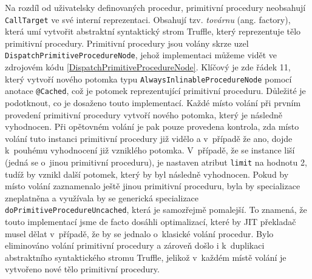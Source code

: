 \documentclass[
  master,
  biblatex,
  figures=true,
  theorems,
  sourcecodes,
  glossaries,
  index
]{kidiplom}
\begin{document}
Na rozdíl od uživatelsky definovaných procedur, primitivní procedury neobsahují \texttt{CallTarget} ve své interní reprezentaci. Obsahují tzv. \textit{továrnu} (ang. factory), která umí vytvořit abstraktní syntaktický strom Truffle, který reprezentuje tělo primitivní procedury. Primitivní procedury jsou volány skrze uzel \texttt{DispatchPrimitiveProcedureNode}, jehož implementaci můžeme vidět ve zdrojovém kódu \ref{DispatchPrimitiveProcedureNode}. Klíčový je zde řádek 11,  který vytvoří nového potomka typu \texttt{AlwaysInlinableProcedureNode} pomocí anotace \texttt{@Cached}, což je potomek reprezentující primitivní proceduru. Důležité je podotknout, co je dosaženo touto implementací. Každé místo volání při prvním provedení primitivní procedury vytvoří nového potomka, který je následně vyhodnocen. Při opětovném volání je pak pouze provedena kontrola, zda místo volání tuto instanci primitivní procedury již vidělo a v~případě že ano, dojde k~pouhému vyhodnocení již vzniklého potomka. V~případě, že se instance liší (jedná se o~jinou primitivní proceduru), je nastaven atribut \texttt{limit} na hodnotu 2, tudíž by vznikl další potomek, který by byl následně vyhodnocen. Pokud by místo volání zaznamenalo ještě jinou primitivní proceduru, byla by specializace zneplatněna a využívala by se generická specializace \texttt{doPrimitiveProcedureUncached}, která je samozřejmě pomalejší. To znamená, že touto implementací jsme de facto dosáhli optimalizací, které by JIT překladač musel dělat v~případě, že by se jednalo o~klasické volání procedur. Bylo eliminováno volání primitivní procedury a zároveň došlo i k~duplikaci abstraktního syntaktického stromu Truffle, jelikož v~každém místě volání je vytvořeno nové tělo primitivní procedury.  
\end{document}
